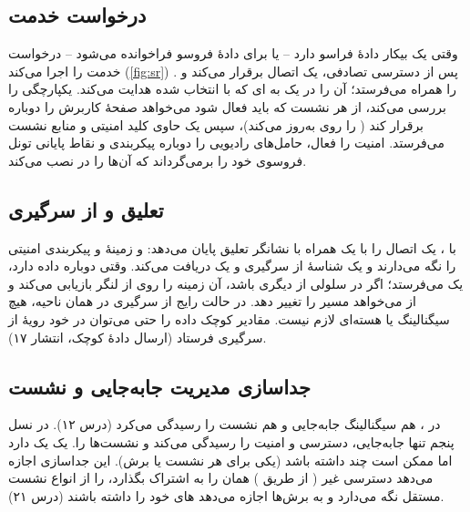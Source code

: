 \documentclass[11pt,a4paper]{article}
\begin{document}
\subsection{درخواست خدمت}
وقتی یک  بیکار دادهٔ فراسو دارد -- یا برای دادهٔ فروسو فراخوانده می‌شود -- درخواست خدمت را اجرا می‌کند (\cref{fig:sr}) \cite{ts23502}. پس
از دسترسی تصادفی،  یک اتصال  برقرار می‌کند و  را همراه  می‌فرستد؛  آن را
در یک  به ای که با  انتخاب شده هدایت می‌کند.  یکپارچگی  را بررسی می‌کند،
از  هر نشست  که باید فعال شود می‌خواهد صفحهٔ کاربرش را دوباره برقرار کند (  را روی  به‌روز می‌کند)،
سپس یک  حاوی کلید امنیتی و منابع نشست می‌فرستد.  امنیت  را فعال، حامل‌های رادیویی را دوباره
پیکربندی و نقاط پایانی تونل فروسوی خود را برمی‌گرداند که  آن‌ها را در  نصب می‌کند.

\begin{acnfigure}
  \caption{درخواست خدمت آغازشده از سوی  از  (ساده‌شده، بر اساس ).}
  \label{fig:sr}
\end{acnfigure}

\subsection{تعلیق و از سرگیری}
با ،  یک اتصال را با یک  همراه با نشانگر تعلیق پایان می‌دهد:  و  زمینهٔ  و پیکربندی
امنیتی را نگه می‌دارند و  یک شناسهٔ از سرگیری و یک  دریافت می‌کند. وقتی  دوباره داده دارد، یک 
می‌فرستد؛ اگر در سلولی از  دیگری باشد، آن  زمینه را روی  از  لنگر بازیابی می‌کند و از  می‌خواهد مسیر
 را تغییر دهد. در حالت رایج از سرگیری در همان ناحیه، هیچ سیگنالینگ  یا هسته‌ای لازم نیست. مقادیر کوچک داده را حتی می‌توان در
خود رویهٔ از سرگیری فرستاد (ارسال دادهٔ کوچک، انتشار ۱۷).

\subsection{جداسازی مدیریت جابه‌جایی و نشست}
در ،  هم سیگنالینگ جابه‌جایی و هم نشست را رسیدگی می‌کرد (درس ۱۲). در نسل پنجم  تنها جابه‌جایی، دسترسی و امنیت 
را رسیدگی می‌کند و  نشست‌ها را. یک  یک  دارد اما ممکن است چند  داشته باشد (یکی برای هر نشست  یا
برش). این جداسازی اجازه می‌دهد دسترسی غیر ( از طریق ) همان  را به اشتراک بگذارد،  را از انواع نشست
مستقل نگه می‌دارد و به برش‌ها اجازه می‌دهد های خود را داشته باشند (درس ۲۱).
\end{document}
